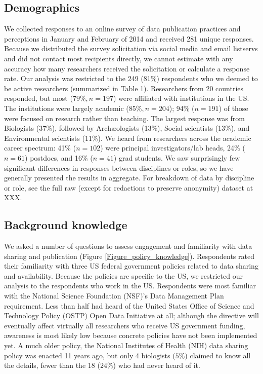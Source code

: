 \documentclass[10pt]{article}
\begin{document}
\subsection*{Demographics}

We collected responses to an online survey of data publication practices and perceptions in January and February of 2014 and received 281 unique responses.
Because we distributed the survey solicitation via social media and email listservs and did not contact most recipients directly, we cannot estimate with any accuracy how many researchers received the solicitation or calculate a response rate.
Our analysis was restricted to the 249 (81\%) respondents who we deemed to be active researchers (summarized in Table 1).
Researchers from 20 countries responded, but most ($79\%, n=197$) were affiliated with institutions in the US.
The institutions were largely academic ($85\%, n=204$); 94\% ($n=191$) of those were focused on research rather than teaching. 
The largest response was from Biologists (37\%), followed by Arch{\ae}ologists (13\%), Social scientists (13\%), and Environmental scientists (11\%).
We heard from researchers across the academic career spectrum: 41\% ($n=102$) were principal investigators/lab heads, 24\% ($n=61$) postdocs, and 16\% ($n=41$) grad students.
We saw surprisingly few significant differences in responses between disciplines or roles, so we have generally presented the results in aggregate.
For breakdown of data by discipline or role, see the full raw (except for redactions to preserve anonymity) dataset at XXX. %

\subsection*{Background knowledge}

We asked a number of questions to assess engagement and familiarity with data sharing and publication (Figure \ref{Figure_policy_knowledge}).
Respondents rated their familiarity with three US federal government policies related to data sharing and availability.
Because the policies are specific to the US, we restricted our analysis to the respondents who work in the US.
Respondents were most familiar with the National Science Foundation (NSF)'s Data Management Plan requirement\cite{national_science_foundation_gpg_2011}.
Less than half had heard of the United States Office of Science and Technology Policy (OSTP) Open Data Initiative\cite{obama_making_2013} at all; although the directive will eventually affect virtually all researchers who receive US government funding, awareness is most likely low because concrete policies have not been implemented yet. 
A much older policy, the National Institutes of Health (NIH) data sharing policy\cite{national_institutes_of_health_final_2003} was enacted 11 years ago, but only 4 biologists ($5\%$) claimed to know all the details, fewer than the 18 ($24\%$) who had never heard of it.
\end{document}
